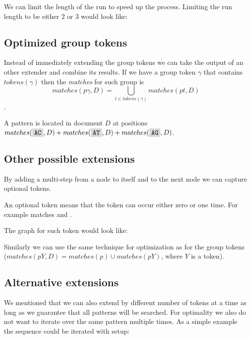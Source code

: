 We can limit the length of the run to speed up the process. Limiting the run length to be either 2 or 3 would look like:

\begin{figure}[H]
	
\end{figure}

\subsection{Optimized group tokens}

Instead of immediately extending the group tokens we can take the output of an other extender and combine its results. If we have a group token $\gamma$ that contains $tokens(\gamma)$ then the \emph{matches} for such group is $$matches(p\gamma, D) = \bigcup_{t \in tokens(\gamma)} matches(pt, D) $$.

\begin{exmp}
A pattern  is located in document $D$ at positions $matches(\R{AC}, D) + matches(\R{AT}, D) + matches(\R{AG}, D)$.
\end{exmp}

\subsection{Other possible extensions}

By adding a multi-step from a node to itself and to the next node we can capture optional tokens.

\begin{exmp}
An optional token  means that the token  can occur either zero or one time. For example  matches  and .
\end{exmp}

The graph for such token would look like:

\begin{figure}[H]
	
\end{figure}

 Similarly we can use the same technique for optimization as for the group tokens ($matches(pY, D) = matches(p) \cup matches(pY)$, where $Y$ is a token).

\subsection{Alternative extensions}

We mentioned that we can also extend by different number of tokens at a time as long as we guarantee that all patterns will be searched. For optimality we also do not want to iterate over the same pattern multiple times. As a simple example the sequence  could be iterated with setup:


